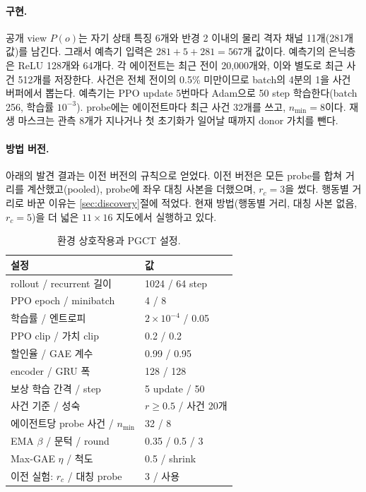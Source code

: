 \documentclass[10pt,twocolumn,letterpaper]{article}
\begin{document}
\paragraph{구현.} 공개 view $P(o)$는 자기 상태 특징 6개와 반경 2 이내의 물리 격자 채널 11개(281개 값)를 남긴다. 그래서 예측기 입력은 $281+5+281=567$개 값이다. 예측기의 은닉층은 ReLU 128개와 64개다. 각 에이전트는 최근 전이 20{,}000개와, 이와 별도로 최근 사건 512개를 저장한다. 사건은 전체 전이의 0.5\% 미만이므로 batch의 4분의 1을 사건 버퍼에서 뽑는다. 예측기는 PPO update 5번마다 Adam으로 50 step 학습한다(batch 256, 학습률 $10^{-3}$). probe에는 에이전트마다 최근 사건 32개를 쓰고, $n_{\min}=8$이다. 재생 마스크는 관측 8개가 지나거나 첫 초기화가 일어날 때까지 donor 가치를 뺀다.

\paragraph{방법 버전.} 아래의 발견 결과는 이전 버전의 규칙으로 얻었다. 이전 버전은 모든 probe를 합쳐 거리를 계산했고(pooled), probe에 좌우 대칭 사본을 더했으며, $r_c=3$을 썼다. 행동별 거리로 바꾼 이유는 \ref{sec:discovery}절에 적었다. 현재 방법(행동별 거리, 대칭 사본 없음, $r_c=5$)을 더 넓은 $11\times16$ 지도에서 실행하고 있다.

\begin{table}[t]\centering\small
\begin{tabular}{ll}\toprule
설정 & 값\\\midrule
rollout / recurrent 길이 & 1024 / 64 step\\
PPO epoch / minibatch & 4 / 8\\
학습률 / 엔트로피 & $2\times10^{-4}$ / 0.05\\
PPO clip / 가치 clip & 0.2 / 0.2\\
할인율 / GAE 계수 & 0.99 / 0.95\\
encoder / GRU 폭 & 128 / 128\\
보상 학습 간격 / step & 5 update / 50\\
사건 기준 / 성숙 & $r\ge0.5$ / 사건 20개\\
에이전트당 probe 사건 / $n_{\min}$ & 32 / 8\\
EMA $\beta$ / 문턱 / round & 0.35 / 0.5 / 3\\
Max-GAE $\eta$ / 척도 & 0.5 / shrink\\
이전 실험: $r_c$ / 대칭 probe & 3 / 사용\\\bottomrule
\end{tabular}
\caption{환경 상호작용과 PGCT 설정.}\label{tab:settings}
\end{table}
\end{document}
